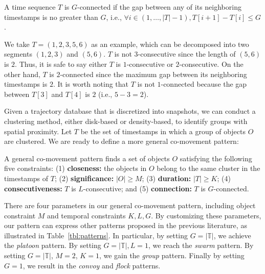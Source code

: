 \begin{definition}[$G$-connected]
A time sequence $T$ is $G$-connected if the gap between any of its neighboring timestamps is no greater than $G$, i.e.,
 $\forall i \in (1,\ldots,|T|-1), T[i+1]-T[i] \leq G$.
\end{definition}

We take $T=(1,2,3,5,6)$ as an example, which can be decomposed into two segments $(1,2,3)$ and $(5,6)$. $T$ is not $3$-consecutive since the length of $(5,6)$ is $2$. Thus, it is safe to say either $T$ is $1$-consecutive or $2$-consecutive. On the other hand, $T$ is $2$-connected since the maximum gap between its neighboring timestamps is $2$. It is worth noting that $T$ is not $1$-connected because the gap between $T[3]$ and $T[4]$ is $2$ (i.e., $5-3=2$).

Given a trajectory database that is discretized into snapshots, we can conduct a clustering method, either disk-based or density-based, to identify groups with spatial proximity. Let $T$ be the set of timestamps in which a group of objects $O$ are clustered. We are ready to define a more general co-movement pattern:
\begin{definition}
A general co-movement pattern finds a set of objects $O$ satisfying the following five constraints: (1) \textbf{closeness:} the objects in $O$ belong to the same cluster in the timestamps of $T$; (2) \textbf{significance:} $|O| \geq M$; (3) \textbf{duration:} $|T| \geq K$; (4) \textbf{consecutiveness:} $T$ is $L$-consecutive; and (5) \textbf{connection:} $T$ is $G$-connected.
\end{definition}
There are four parameters in our general co-movement pattern, including object constraint $M$ and temporal constraints $K,L,G$. 
By customizing these parameters, our pattern can 
express other patterns proposed in the previous literature, as illustrated in Table~\ref{tbl:patterns}. 
In particular, by setting $G=|\mathbb{T}|$, we achieve the \emph{platoon} pattern. By setting $G=|\mathbb{T}|,L=1$, we reach the \emph{swarm} pattern. By setting $G=|\mathbb{T}|$, $M=2$, $K=1$, we gain the \emph{group} pattern. Finally by setting $G=1$, we result in the \emph{convoy} and \emph{flock} patterns. 
